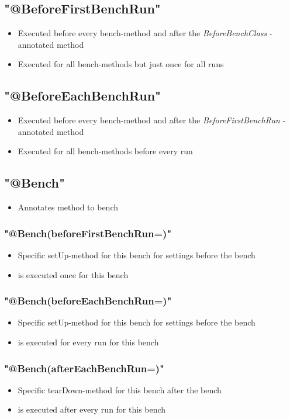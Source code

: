 \documentclass[12pt]{article}
\begin{document}
\subsection{"@BeforeFirstBenchRun"}
\begin{itemize}
\item Executed before every bench-method and after the \emph{BeforeBenchClass} - annotated method
\item Executed for all bench-methods but just once for all runs
\end{itemize}
\subsection{"@BeforeEachBenchRun"}
\begin{itemize}
\item Executed before every bench-method and after the \emph{BeforeFirstBenchRun} - annotated method
\item Executed for all bench-methods before every run
\end{itemize}
\subsection{"@Bench"}
\begin{itemize}
\item Annotates method to bench
\end{itemize}
\subsubsection{"@Bench(beforeFirstBenchRun=)"} 
\begin{itemize}
\item Specific setUp-method for this bench for settings before the bench
\item is executed once for this bench
\end{itemize}
\subsubsection{"@Bench(beforeEachBenchRun=)"} 
\begin{itemize}
\item Specific setUp-method for this bench for settings before the bench
\item is executed for every run for this bench
\end{itemize}
\subsubsection{"@Bench(afterEachBenchRun=)"}
\begin{itemize}
\item Specific tearDown-method for this bench after the bench
\item is executed after every run for this bench
\end{itemize}
\end{document}

